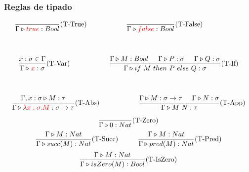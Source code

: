 \documentclass[10pt,a4paper]{article}
\begin{document}
\subsubsection{Reglas de tipado}

\begin{equation*}
\begin{gathered}
    \frac{}{\judgeType{\Gamma}{\lambdaValue{true}}{Bool}}(\text{T-True}) \hspace*{2cm} \frac{}{\judgeType{\Gamma}{\lambdaValue{false}}{Bool}}(\text{T-False})\hspace*{2cm} \\
    \vspace*{5mm} \\
    \frac{x:\sigma\in\Gamma}{\judgeType{\Gamma}{\lambdaValue{x}}{\sigma}}(\text{T-Var})\hspace*{2cm}
    \frac{\judgeType{\Gamma}{M}{Bool}\hspace*{5mm}\judgeType{\Gamma}{P}{\sigma}\hspace*{5mm}\judgeType{\Gamma}{Q}{\sigma}}{\judgeType{\Gamma}{\lambdaIf{M}{P}{Q}}{\sigma}}(\text{T-If}) \\
    \vspace*{5mm} \\
    \frac {\judgeType{\Gamma,x:\sigma}{M}{\tau}}
          {\judgeType{\Gamma}{\lambdaValue{\lambdaAbs{x}{\sigma}{M}}}{\sigma\to\tau}}(\text{T-Abs})\hspace*{2cm}
    \frac{\judgeType{\Gamma}{M}{\sigma\to\tau}\hspace*{5mm}\judgeType{\Gamma}{N}{\sigma}}{\judgeType{\Gamma}{\lambdaApp{M}{N}}{\tau}}(\text{T-App})
\end{gathered}
\end{equation*}

\vspace*{5mm}
\begin{equation*}
\frac{}{\Gamma\triangleright 0 : Nat}(\text{T-Zero})
\end{equation*}
\vspace*{5mm}
\begin{equation*}
\frac{\Gamma\triangleright M : Nat}
{\Gamma\triangleright succ(M) : Nat}(\text{T-Succ})\hspace*{1cm}
\frac{\Gamma\triangleright M : Nat}{\Gamma\triangleright pred(M) : Nat}(\text{T-Pred})
\end{equation*}
\vspace*{5mm}
\begin{equation*}
\frac{\Gamma\triangleright M : Nat}{\Gamma\triangleright isZero(M) : Bool}(\text{T-IsZero})
\end{equation*}
\end{document}
